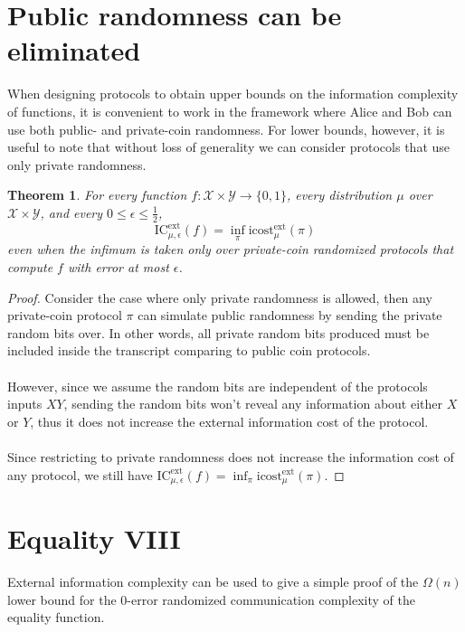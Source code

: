 \documentclass[11pt,oneside]{book}
\theoremstyle{plain}
\newtheorem{theorem}{Theorem}
\theoremstyle{definition}
\theoremstyle{plain}
\newcommand{\calX}{\mathcal{X}}
\newcommand{\calY}{\mathcal{Y}}
\newcommand{\ICext}{\mathrm{IC}^{\mathrm{ext}}}
\newcommand{\icostext}{\mathrm{icost}^{\mathrm{ext}}}
\begin{document}
 
\section{Public randomness can be eliminated}

When designing protocols to obtain upper bounds on the information complexity of functions, it is convenient to work in the framework where Alice and Bob can use both public- and private-coin randomness. For lower bounds, however, it is useful to note that without loss of generality we can consider protocols that use only private randomness.

\begin{theorem}
	For every function $f : \calX \times \calY \to \{0,1\}$, every distribution $\mu$ over $\calX \times \calY$, and every $0 \le \epsilon \le \frac12$,
	\[
	\ICext_{\mu,\epsilon}(f) = \inf_{\pi} \icostext_\mu(\pi)
	\]
	even when the infimum is taken only over private-coin randomized protocols that compute $f$ with error at most $\epsilon$.
\end{theorem}

\begin{proof}
	Consider the case where only private randomness is allowed, then any private-coin protocol $\pi$ can simulate public randomness by sending the private random bits over. In other words, all private random bits produced must be included inside the transcript comparing to public coin protocols. \\
	\\
	However, since we assume the random bits are independent of the protocols inputs $XY$, sending the random bits won't reveal any information about either $X$ or $Y$, thus it does not increase the external information cost of the protocol.\\
	\\
	Since restricting to private randomness does not increase the information cost of any protocol, we still have $\ICext_{\mu,\epsilon}(f) = \inf_{\pi} \icostext_\mu(\pi)$.
\end{proof}


 
\section{Equality VIII}

External information complexity can be used to give a simple proof of the $\Omega(n)$ lower bound for the $0$-error randomized communication complexity of the equality function.
\end{document}
